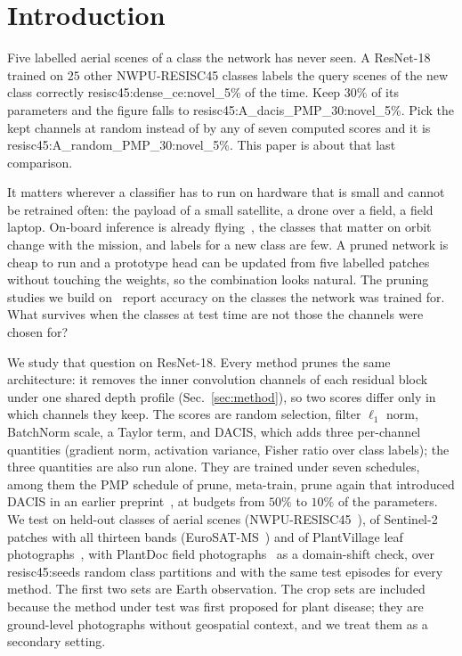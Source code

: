 \section{Introduction}
\label{sec:intro}

Five labelled aerial scenes of a class the network has never seen. A ResNet-18 trained on $25$ other NWPU-RESISC45 classes labels the query scenes of the new class correctly \num{resisc45:dense_ce:novel_5}\% of the time. Keep $30\%$ of its parameters and the figure falls to \num{resisc45:A_dacis_PMP_30:novel_5}\%. Pick the kept channels at random instead of by any of seven computed scores and it is \num{resisc45:A_random_PMP_30:novel_5}\%. This paper is about that last comparison.

It matters wherever a classifier has to run on hardware that is small and cannot be retrained often: the payload of a small satellite, a drone over a field, a field laptop. On-board inference is already flying~\cite{giuffrida2020cloudscout,giuffrida2022phisat}, the classes that matter on orbit change with the mission, and labels for a new class are few. A pruned network is cheap to run and a prototype head can be updated from five labelled patches without touching the weights, so the combination looks natural. The pruning studies we build on~\cite{li2017pruning,liu2017slimming,molchanov2017pruning,he2017channel} report accuracy on the classes the network was trained for. What survives when the classes at test time are not those the channels were chosen for?

We study that question on ResNet-18. Every method prunes the same architecture: it removes the inner convolution channels of each residual block under one shared depth profile (Sec.~\ref{sec:method}), so two scores differ only in which channels they keep. The scores are random selection, filter $\ell_1$ norm, BatchNorm scale, a Taylor term, and DACIS, which adds three per-channel quantities (gradient norm, activation variance, Fisher ratio over class labels); the three quantities are also run alone. They are trained under seven schedules, among them the PMP schedule of prune, meta-train, prune again that introduced DACIS in an earlier preprint~\cite{uddin2026preprint}, at budgets from $50\%$ to $10\%$ of the parameters. We test on held-out classes of aerial scenes (NWPU-RESISC45~\cite{cheng2017resisc}), of Sentinel-2 patches with all thirteen bands (EuroSAT-MS~\cite{helber2019eurosat}) and of PlantVillage leaf photographs~\cite{hughes2015plantvillage}, with PlantDoc field photographs~\cite{singh2020plantdoc} as a domain-shift check, over \num{resisc45:seeds} random class partitions and with the same test episodes for every method. The first two sets are Earth observation. The crop sets are included because the method under test was first proposed for plant disease; they are ground-level photographs without geospatial context, and we treat them as a secondary setting.

